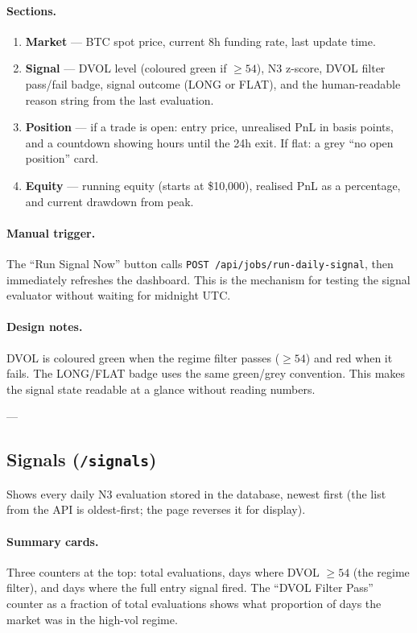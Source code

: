 \documentclass[12pt, a4paper]{article}
\begin{document}
\paragraph{Sections.}
\begin{enumerate}[noitemsep]
  \item \textbf{Market} — BTC spot price, current 8h funding rate, last update time.
  \item \textbf{Signal} — DVOL level (coloured green if $\geq 54$), N3 z-score,
        DVOL filter pass/fail badge, signal outcome (LONG or FLAT),
        and the human-readable reason string from the last evaluation.
  \item \textbf{Position} — if a trade is open: entry price, unrealised PnL in basis
        points, and a countdown showing hours until the 24h exit. If flat: a grey
        ``no open position'' card.
  \item \textbf{Equity} — running equity (starts at \$10,000), realised PnL as a
        percentage, and current drawdown from peak.
\end{enumerate}

\paragraph{Manual trigger.}
The ``Run Signal Now'' button calls \texttt{POST /api/jobs/run-daily-signal},
then immediately refreshes the dashboard. This is the mechanism for testing the
signal evaluator without waiting for midnight UTC.

\paragraph{Design notes.}
DVOL is coloured \textcolor[HTML]{4ade80}{green} when the regime filter passes
($\geq 54$) and \textcolor[HTML]{f87171}{red} when it fails. The LONG/FLAT
badge uses the same green/grey convention. This makes the signal state readable
at a glance without reading numbers.

---

\subsection{Signals (\texttt{/signals})}

Shows every daily N3 evaluation stored in the database, newest first (the
list from the API is oldest-first; the page reverses it for display).

\paragraph{Summary cards.}
Three counters at the top: total evaluations, days where DVOL $\geq 54$
(the regime filter), and days where the full entry signal fired. The
``DVOL Filter Pass'' counter as a fraction of total evaluations shows
what proportion of days the market was in the high-vol regime.
\end{document}
